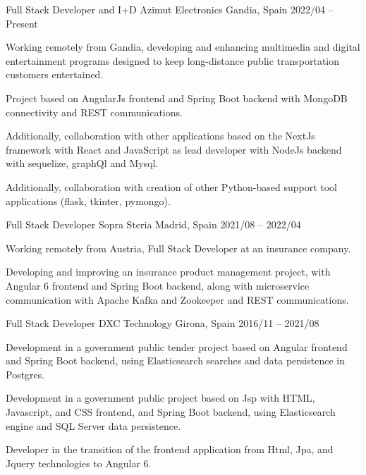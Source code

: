 \documentclass[]{awesome-cv}
\begin{document}
\begin{cventries}
	\cventry
	{Full Stack Developer and I+D}
	{Azimut Electronics}
	{Gandia, Spain}
	{2022/04 – Present}
	{\begin{cvitems}
		\vspace{0.5mm}
		\item {Working remotely from Gandia, developing and enhancing multimedia and digital entertainment programs designed to keep long-distance public transportation customers entertained.}
		\item {Project based on AngularJs frontend and Spring Boot backend with MongoDB connectivity and REST communications.}
        \item {Additionally, collaboration with other applications based on the NextJs framework with React and JavaScript as lead developer with NodeJs backend with sequelize, graphQl and Mysql.}
        \item {Additionally, collaboration with creation of other Python-based support tool applications (flask, tkinter, pymongo).}
		\end{cvitems}}

	\cventry
	{Full Stack Developer}
	{Sopra Steria}
	{Madrid, Spain}
	{2021/08 – 2022/04}
	{\begin{cvitems}
		\vspace{0.5mm}
		\item {Working remotely from Austria, Full Stack Developer at an insurance company.}
		\item {Developing and improving an insurance product management project, with Angular 6 frontend and Spring Boot backend, along with microservice communication with Apache Kafka and Zookeeper and REST communications.}
		\end{cvitems}}

	\cventry
	{Full Stack Developer}
	{DXC Technology}
	{Girona, Spain}
	{2016/11 – 2021/08}
	{\begin{cvitems}
		\vspace{0.5mm}
		\item {Development in a government public tender project based on Angular frontend and Spring Boot backend, using Elasticsearch searches and data persistence in Postgres.}
  \item {Development in a government public project based on Jsp with HTML, Javascript, and CSS frontend, and Spring Boot backend, using Elasticsearch engine and SQL Server data persistence.}
  \item {Developer in the transition of the frontend application from Html, Jpa, and Jquery technologies to Angular 6.}
		\end{cvitems}}


\end{cventries}
\end{document}
